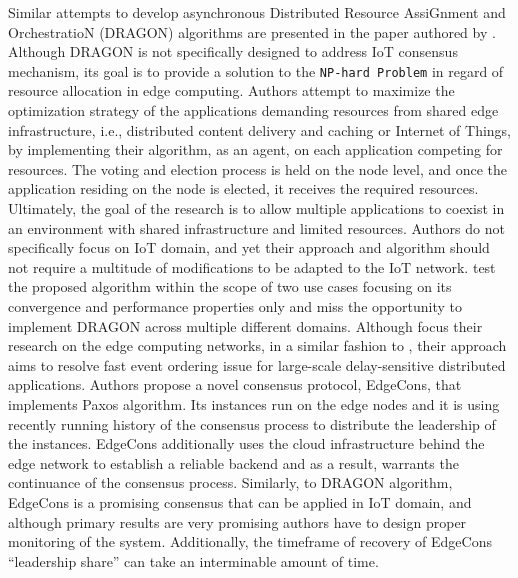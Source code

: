 \documentclass[oneside,12pt]{book}
\begin{document}
Similar attempts to develop asynchronous Distributed Resource AssiGnment and OrchestratioN (DRAGON) algorithms are presented in the paper authored by \cite{8737532}. Although DRAGON is not specifically designed to address IoT consensus mechanism, its goal is to provide a solution to the \texttt{NP-hard Problem} in regard of resource allocation in edge computing. Authors attempt to maximize the optimization strategy of the applications demanding resources from shared edge infrastructure, i.e., distributed content delivery and caching or Internet of Things, by implementing their algorithm, as an agent, on each application competing for resources. The voting and election process is held on the node level, and once the application residing on the node is elected, it receives the required resources. Ultimately, the goal of the research is to allow multiple applications to coexist in an environment with shared infrastructure and limited resources. Authors do not specifically focus on IoT domain, and yet their approach and algorithm should not require a multitude of modifications to be adapted to the IoT network. \cite{8737532} test the proposed algorithm within the scope of two use cases focusing on its convergence and performance properties only and miss the opportunity to implement DRAGON across multiple different domains.\smallskip \newline
Although \cite{Hao2018EdgeConsAE} focus their research on the edge computing networks, in a similar fashion to \cite{8737532}, their approach aims to resolve fast event ordering issue for large-scale delay-sensitive distributed applications. Authors propose a novel consensus protocol, EdgeCons, that implements Paxos algorithm. Its instances run on the edge nodes and it is using recently running history of the consensus process to distribute the leadership of the instances. EdgeCons additionally uses the cloud infrastructure behind the edge network to establish a reliable backend and as a result, warrants the continuance of the consensus process. Similarly, to DRAGON algorithm, EdgeCons is a promising consensus that can be applied in IoT domain, and although primary results are very promising authors have to design proper monitoring of the system. Additionally, the timeframe of recovery of EdgeCons “leadership share” can take an interminable amount of time.\smallskip \newline
\end{document}
